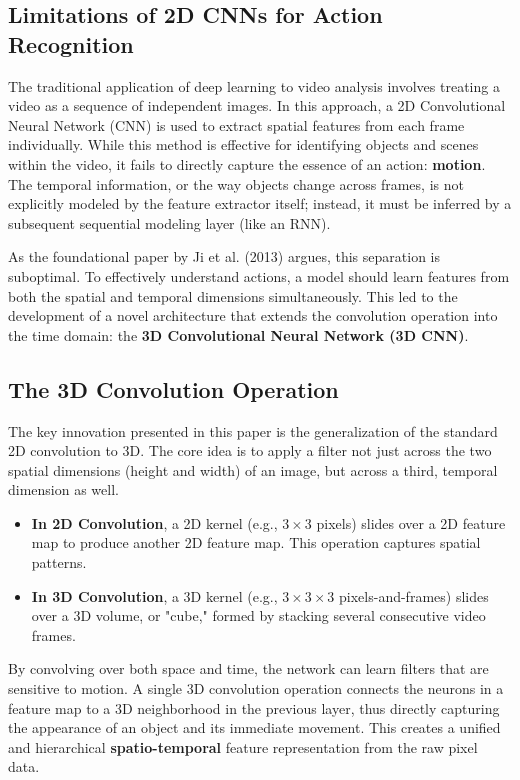 \subsection{Limitations of 2D CNNs for Action Recognition}

The traditional application of deep learning to video analysis involves treating a video as a sequence of independent images. In this approach, a 2D Convolutional Neural Network (CNN) is used to extract spatial features from each frame individually. While this method is effective for identifying objects and scenes within the video, it fails to directly capture the essence of an action: \textbf{motion}. The temporal information, or the way objects change across frames, is not explicitly modeled by the feature extractor itself; instead, it must be inferred by a subsequent sequential modeling layer (like an RNN).

As the foundational paper by Ji et al. (2013) argues, this separation is suboptimal. To effectively understand actions, a model should learn features from both the spatial and temporal dimensions simultaneously. This led to the development of a novel architecture that extends the convolution operation into the time domain: the \textbf{3D Convolutional Neural Network (3D CNN)}.

\subsection{The 3D Convolution Operation}

The key innovation presented in this paper is the generalization of the standard 2D convolution to 3D. The core idea is to apply a filter not just across the two spatial dimensions (height and width) of an image, but across a third, temporal dimension as well.

\begin{itemize}
    \item \textbf{In 2D Convolution}, a 2D kernel (e.g., $3 \times 3$ pixels) slides over a 2D feature map to produce another 2D feature map. This operation captures spatial patterns.
    \item \textbf{In 3D Convolution}, a 3D kernel (e.g., $3 \times 3 \times 3$ pixels-and-frames) slides over a 3D volume, or "cube," formed by stacking several consecutive video frames. 
\end{itemize}

By convolving over both space and time, the network can learn filters that are sensitive to motion. A single 3D convolution operation connects the neurons in a feature map to a 3D neighborhood in the previous layer, thus directly capturing the appearance of an object and its immediate movement. This creates a unified and hierarchical \textbf{spatio-temporal} feature representation from the raw pixel data.

